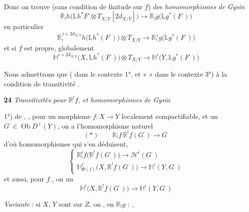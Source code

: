 \documentclass[11pt,a4paper]{article}
\begin{document}

Donc on trouve (sans condition de finitude sur $f$) des \emph{homomorphismes de Gysin}
\[
\mathbb{R}_!h\bigl(\mathbb{L}h^{*}F^{\cdot}\otimes T_{X/Y}[2d_{X/Y}]\bigr)\longrightarrow\mathbb{R}_!g\bigl(\mathbb{L}g^{*}(F^{\cdot})\bigr)
\]
en particulier
\[
\mathbb{R}_!^{\,i+2d_{X/Y}}h\bigl(\mathbb{L}h^{*}(F^{\cdot})\bigr)\otimes T_{X/Y}\longrightarrow\mathbb{R}_!^{\,i}g\bigl(\mathbb{L}g^{*}(F^{\cdot})\bigr)
\]
et si $f$ est propre, globalement
\[
\mathbb{H}^{i+2d_{X/Y}}\bigl(X,\mathbb{L}h^{*}(F^{\cdot})\bigr)\otimes T_{X/Y}\longrightarrow\mathbb{H}^{i}\bigl(Y,\mathbb{L}g^{*}(F^{\cdot})\bigr)
\]

Nous admettrons que \ill{}  ( dans le contexte 1°, et « \ill{} » dans le contexte 3°) à la condition de transitivité  \ill{}.

\textbf{24} \struck{\ill{}} \emph{Transitivités pour $\mathbb{R}^!f$, et homomorphismes de Gysin}

1°)  de , \ill{} , pour un morphisme $f\colon X\to Y$ localement compactifiable,  et un $G^{\cdot}\in\operatorname{Ob}D^{+}(Y)$, on a l'homomorphisme naturel
\[
(*)\qquad \mathbb{R}_!f\,\mathbb{R}^!f(G^{\cdot})\longrightarrow G^{\cdot}
\]
d'où \ill{} homomorphismes qui s'en déduisent,
\[
\begin{cases}
\mathbb{R}^{i}_!f\bigl(\mathbb{R}^!f(G^{\cdot})\bigr)\longrightarrow\mathcal{H}^{i}(G^{\cdot})\\
\mathbb{H}^{i}_{\Phi(f)}\bigl(X,\mathbb{R}^!f(G^{\cdot})\bigr)\longrightarrow\mathbb{H}^{i}(Y,G^{\cdot})
\end{cases}
\]
et aussi, pour $f$ , on  un
\[
\mathbb{H}^{i}\bigl(X,\mathbb{R}^!f(G^{\cdot})\bigr)\longrightarrow\mathbb{H}^{i}(Y,G^{\cdot})
\]

\emph{Variante} : si $X$, $Y$ sont sur $Z$,  on , en  $\mathbb{R}_!g$ : \ill{},
\end{document}
